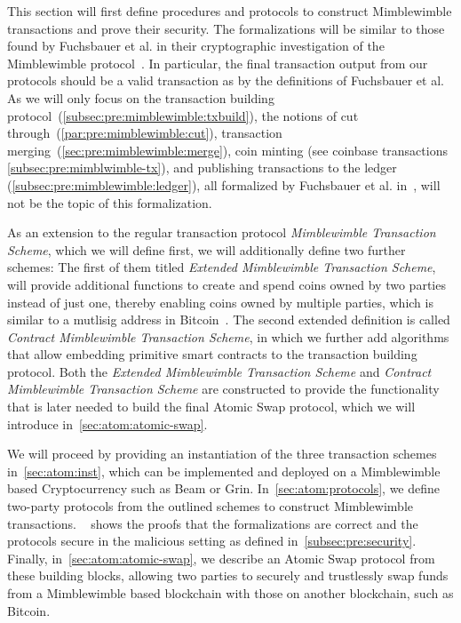 This section will first define procedures and protocols to construct Mimblewimble transactions and prove their security.
The formalizations will be similar to those found by Fuchsbauer et al. in their cryptographic investigation of the Mimblewimble protocol~\cite{fuchsbauer2019aggregate}.
In particular, the final transaction output from our protocols should be a valid transaction as by the definitions of Fuchsbauer et al.
As we will only focus on the transaction building protocol~(\cref{subsec:pre:mimblewimble:txbuild}), the notions of cut through~(\cref{par:pre:mimblewimble:cut}), transaction merging~(\cref{sec:pre:mimblewimble:merge}), coin minting (see coinbase transactions \cref{subsec:pre:mimblwimble-tx}), and publishing transactions to the ledger (\cref{subsec:pre:mimblewimble:ledger}), all formalized by Fuchsbauer et al. in~\cite{fuchsbauer2019aggregate}, will not be the topic of this formalization.

As an extension to the regular transaction protocol \emph{Mimblewimble Transaction Scheme}, which we will define first, we will additionally define two further schemes:
The first of them titled \emph{Extended Mimblewimble Transaction Scheme}, will provide additional functions to create and spend coins owned by two parties instead of just one, thereby enabling coins owned by multiple parties, which is similar to a mutlisig address in Bitcoin~\cite{antonopoulos2014mastering}.
The second extended definition is called \emph{Contract Mimblewimble Transaction Scheme}, in which we further add algorithms that allow embedding primitive smart contracts to the transaction building protocol.
Both the \emph{Extended Mimblewimble Transaction Scheme} and \emph{Contract Mimblewimble Transaction Scheme} are constructed to provide the functionality that is later needed to build the final Atomic Swap protocol, which we will introduce in~\cref{sec:atom:atomic-swap}.

We will proceed by providing an instantiation of the three transaction schemes in~\cref{sec:atom:inst}, which can be implemented and deployed on a Mimblewimble based Cryptocurrency such as Beam or Grin.
In~\cref{sec:atom:protocols}, we define two-party protocols from the outlined schemes to construct Mimblewimble transactions.
~ shows the proofs that the formalizations are correct and the protocols secure in the malicious setting as defined in~\cref{subsec:pre:security}.
Finally, in~\cref{sec:atom:atomic-swap}, we describe an Atomic Swap protocol from these building blocks, allowing two parties to securely and trustlessly swap funds from a Mimblewimble based blockchain with those on another blockchain, such as Bitcoin.

